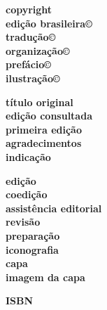 \newcommand{\linha}[2]{\ifdef{#2}{\linhalayout{#1}{#2}}{}}

\begingroup\tiny
\parindent=0cm
\thispagestyle{empty}

\textbf{copyright}\\
\textbf{edição brasileira©}\\
\textbf{tradução©}\\
\textbf{organização©}\\
\textbf{prefácio©}\\
\textbf{ilustração©}\medskip

\textbf{título original}\\
\textbf{edição consultada}\\
\textbf{primeira edição}\\
\textbf{agradecimentos}\\
\textbf{indicação}\medskip

\textbf{edição}\\
\textbf{coedição}\\
\textbf{assistência editorial}\\
\textbf{revisão}\\
\textbf{preparação}\\
\textbf{iconografia}\\
\textbf{capa}\\
\textbf{imagem da capa}\medskip

\textbf{ISBN}\smallskip

 
